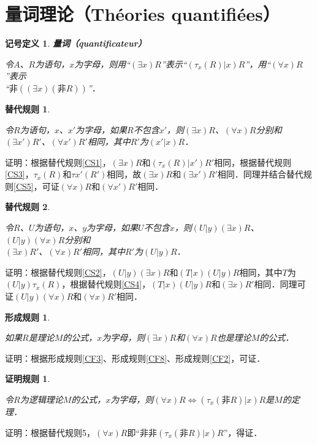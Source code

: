 \documentclass[12pt, a4paper, oneside]{book}
\newtheorem{sign}{记号定义}
\newtheorem{CS}{替代规则}
\newtheorem{CF}{形成规则}
\newtheorem{C}{证明规则}
\begin{document}
		\section{量词理论（Théories quantifiées）}
		
			\begin{sign}
				\textbf{量词（quantificateur）}
				\par
				令$A$、$R$为语句，$x$为字母，则用“$(\exists x)R$”表示“$(\tau_x(R)|x)R$”，用“$(\forall x)R$”表示\\“$\text{非}((\exists x)(\text{非}R))$”．
			\end{sign}

			\begin{CS}\label{CS8}
				\hfill\par
				令$R$为语句，$x$、$x'$为字母，如果$R$不包含$x'$，则$(\exists x)R$、$(\forall x)R$分别和$(\exists x')R'$、$(\forall x')R'$相同，其中$R'$为$(x'|x)R$．
			\end{CS}
			证明：根据替代规则\ref{CS1}，$(\exists x)R$和$(\tau_x(R)|x')R'$相同，根据替代规则\ref{CS3}，$\tau_x(R)$和$\tau x'(R')$相同，故$(\exists x)R$和$(\exists x' )R'$相同．同理并结合替代规则\ref{CS5}，可证$(\forall x)R$和$(\forall x' )R'$相同．
				
			\begin{CS}\label{CS9}
				\hfill\par
				令$R$、$U$为语句，$x$、$y$为字母，如果$U$不包含$x$，则$(U|y)(\exists x)R$、$(U|y)(\forall x)R$分别和\\$(\exists x)R'$、$(\forall x)R'$相同，其中$R'$为$(U|y)R$．
			\end{CS}
			证明：根据替代规则\ref{CS2}，$(U|y)(\exists x)R$和$(T|x)(U|y)R$相同，其中$T$为$(U|y)\tau_x(R)$，根据替代规则\ref{CS4}，$(T|x)(U|y)R$和$(\exists x)R'$相同．同理可证$(U|y)(\forall x)R$和$(\forall x)R'$相同．	

			\begin{CF}\label{CF11}
				\hfill\par
				如果$R$是理论$M$的公式，$x$为字母，则$(\exists x)R$和$(\forall x)R$也是理论$M$的公式．
			\end{CF}
			证明：根据形成规则\ref{CF3}、形成规则\ref{CF8}、形成规则\ref{CF2}，可证．

			\begin{C}\label{C26}
				\hfill\par
				令$R$为逻辑理论$M$的公式，$x$为字母，则$(\forall x)R\Leftrightarrow(\tau_x(\text{非}R)|x)R$是$M$的定理．
			\end{C}
			证明：根据替代规则5，$(\forall x)R$即“$\text{非}\text{非}(\tau_x(\text{非}R)|x)R$”，得证．
\end{document}
